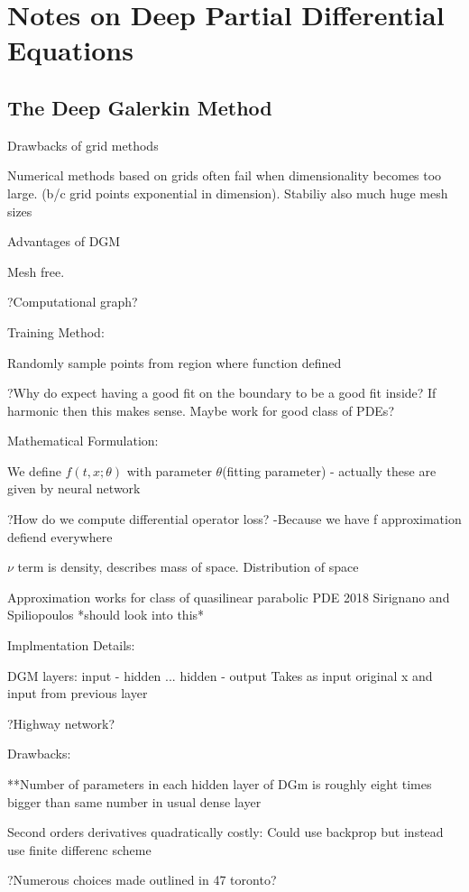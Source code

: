 \documentclass[10pt]{article}
\newcommand{\1}{\textbf{1}}
\theoremstyle{remark}
\theoremstyle{definition}
\begin{document}
\section{Notes on Deep Partial Differential Equations}

\subsection{The Deep Galerkin Method}

Drawbacks of grid methods

Numerical methods based on grids often fail when dimensionality becomes too large. (b/c grid points exponential in dimension). Stabiliy also much huge mesh sizes

Advantages of DGM

Mesh free. 

?Computational graph? 

Training Method:

Randomly sample points from region where function defined

?Why do expect having a good fit on the boundary to be a good fit inside?
	If harmonic then this makes sense. Maybe work for good class of PDEs?

Mathematical Formulation:

We define $f(t,x;\theta)$ with parameter $\theta$(fitting parameter)  - actually these are given by neural network

?How do we compute differential operator loss?
-Because we have f approximation defiend everywhere

$\nu$ term is density, describes mass of space. Distribution of space

Approximation works for class of quasilinear parabolic PDE
2018 Sirignano and Spiliopoulos *should look into this*

Implmentation Details:

DGM layers: input - hidden ... hidden - output
	Takes as input original x and input from previous layer

?Highway network?

Drawbacks:

**Number of parameters in each hidden layer of DGm is roughly eight times bigger than same number in usual dense layer

Second orders derivatives quadratically costly: Could use backprop but instead use finite differenc scheme

?Numerous choices made outlined in 47 toronto?
\end{document}
